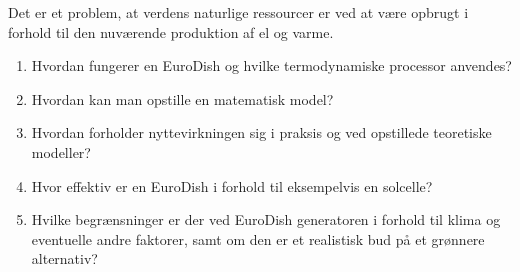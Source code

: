 \documentclass[SRC.tex]{subfiles}
\begin{document}
	Det er et problem, at verdens naturlige ressourcer er ved at være opbrugt i forhold til den nuværende produktion af el og varme.  
	\begin{enumerate}[-]
		\item Hvordan fungerer en EuroDish og hvilke termodynamiske processor anvendes?
		\item Hvordan kan man opstille en matematisk model?
		\item Hvordan forholder nyttevirkningen sig i praksis og ved opstillede teoretiske modeller?
		\item Hvor effektiv er en EuroDish i forhold til eksempelvis en solcelle?
		\item Hvilke begrænsninger er der ved  EuroDish generatoren i forhold til klima og eventuelle andre faktorer, samt om den er et realistisk bud på et grønnere alternativ? 
	\end{enumerate} 
\end{document}

